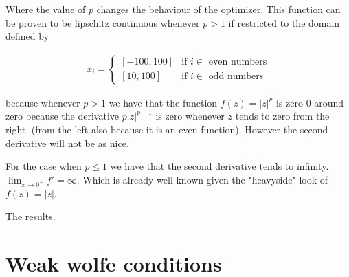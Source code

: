Where the value of $p$ changes the behaviour of the optimizer. This function can be proven to be lipschitz continuous whenever $p > 1$ if restricted to the domain defined by 

\begin{equation}
  \begin{aligned}
    x_i = 
    \begin{cases}
      [-100, 100] & \text{if } i \in \text{ even numbers} \\
      [10, 100] & \text{if } i \in \text{ odd numbers}
    \end{cases}
  \end{aligned}
\end{equation}

because whenever $p > 1$ we have that the function $f(z) = |z|^p$ is zero $0$ around zero because the derivative $p |z| ^{p-1}$ is zero whenever $z$ tends to zero from the right. (from the left also because it is an even function). However the second derivative will not be as nice.

For the case when $p \leq 1$ we have that the second derivative tends to infinity. $\lim_{x \rightarrow 0^+} f' = \infty$. Which is already well known given the "heavyside" look of $f(z) = |z|$.

The results.

\section{Weak wolfe conditions}
